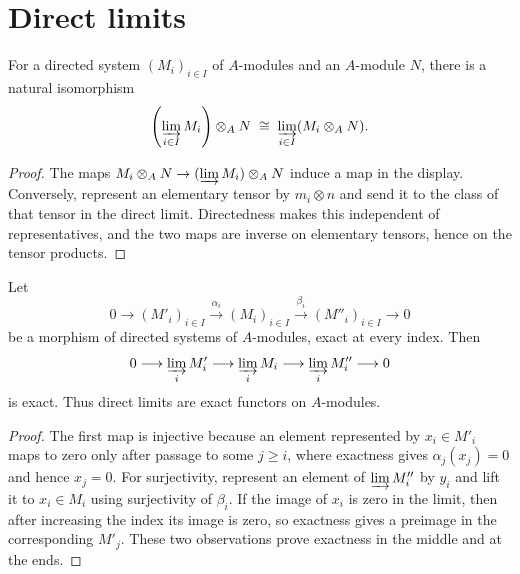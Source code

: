 \section{Direct limits}

\begin{theorem}
\label{mcrt-thm-a-1}
\uses{}
For a directed system $(M_i)_{i\in I}$ of $A$-modules and an $A$-module $N$,
there is a natural isomorphism
\[
\left(\varinjlim_{i\in I}M_i\right)\otimes_A N
\;\cong\;\varinjlim_{i\in I}(M_i\otimes_A N).
\]
\end{theorem}
\begin{proof}
The maps $M_i\otimes_A N\to(\varinjlim M_i)\otimes_A N$ induce a map in the
display.  Conversely, represent an elementary tensor by $m_i\otimes n$ and
send it to the class of that tensor in the direct limit.  Directedness makes
this independent of representatives, and the two maps are inverse on
elementary tensors, hence on the tensor products.
\end{proof}

\begin{theorem}
\label{mcrt-thm-a-2}
\uses{}
Let
\[
0\longrightarrow(M'_i)_{i\in I}\xrightarrow{\,\alpha_i\,}
(M_i)_{i\in I}\xrightarrow{\,\beta_i\,}(M''_i)_{i\in I}
\longrightarrow0
\]
be a morphism of directed systems of $A$-modules, exact at every index.
Then
\[
0\longrightarrow\varinjlim_i M'_i\longrightarrow\varinjlim_i M_i
\longrightarrow\varinjlim_i M''_i\longrightarrow0
\]
is exact.  Thus direct limits are exact functors on $A$-modules.
\end{theorem}
\begin{proof}
The first map is injective because an element represented by $x_i\in M'_i$
maps to zero only after passage to some $j\geq i$, where exactness gives
$\alpha_j(x_j)=0$ and hence $x_j=0$.  For surjectivity, represent an element
of $\varinjlim M''_i$ by $y_i$ and lift it to $x_i\in M_i$ using surjectivity
of $\beta_i$.  If the image of $x_i$ is zero in the limit, then after increasing
the index its image is zero, so exactness gives a preimage in the corresponding
$M'_j$.  These two observations prove exactness in the middle and at the ends.
\end{proof}
